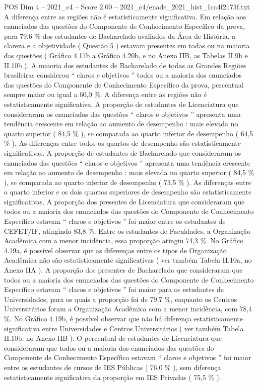 \begin{textsample}{POS Dim 4 – 2021\_c4 – Score 2.00 – 2021\_c4/enade\_2021\_hist\_1ca4f2173f.txt}
A diferença entre as regiões não é estatisticamente significativa.
Em relação aos enunciados das questões do Componente de Conhecimento Específico da prova, para 79,6 \% dos estudantes de Bacharelado avaliados da Área de História, a clareza e a objetividade ( Questão 5 ) estavam presentes em todas ou na maioria das questões ( Gráfico 4.17b a Gráfico 4.20b, e no Anexo IIB, as Tabelas II.9b e II.10b ).
A maioria dos estudantes de Bacharelado de todas as Grandes Regiões brasileiras considerou “ claros e objetivos ” todos ou a maioria dos enunciados das questões do Componente de Conhecimento Específico da prova, percentual sempre maior ou igual a 60,0 \%.
A diferença entre as regiões não é estatisticamente significativa.
A proporção de estudantes de Licenciatura que consideraram os enunciados das questões “ claros e objetivos ” apresenta uma tendência crescente em relação ao aumento de desempenho : mais elevada no quarto superior ( 84,5 \% ), se comparada ao quarto inferior de desempenho ( 64,5 \% ).
As diferenças entre todos os quartos de desempenho são estatisticamente significativas.
A proporção de estudantes de Bacharelado que consideraram os enunciados das questões “ claros e objetivos ” apresenta uma tendência crescente em relação ao aumento de desempenho : mais elevada no quarto superior ( 84,5 \% ), se comparada ao quarto inferior de desempenho ( 73,5 \% ).
As diferenças entre o quarto inferior e os dois quartos superiores de desempenho são estatisticamente significativas.
A proporção dos presentes de Licenciatura que consideraram que todos ou a maioria dos enunciados das questões do Componente de Conhecimento Específico estavam “ claros e objetivos ” foi maior entre os estudantes de CEFET/IF, atingindo 83,8 \%.
Entre os estudantes de Faculdades, a Organização Acadêmica com a menor incidência, essa proporção atingiu 74,3 \%.
No Gráfico 4.19a, é possível observar que as diferenças entre os tipos de Organização Acadêmica não são estatisticamente significativas ( ver também Tabela II.10a, no Anexo IIA ).
A proporção dos presentes de Bacharelado que consideraram que todos ou a maioria dos enunciados das questões do Componente de Conhecimento Específico estavam “ claros e objetivos ” foi maior para os estudantes de Universidades, para os quais a proporção foi de 79,7 \%, enquanto os Centros Universitários foram a Organização Acadêmica com a menor incidência, com 78,4 \%.
No Gráfico 4.19b, é possível observar que não há diferença estatisticamente significativa entre Universidades e Centros Universitários ( ver também Tabela II.10b, no Anexo IIB ).
O percentual de estudantes de Licenciatura que consideraram que todos ou a maioria dos enunciados das questões do Componente de Conhecimento Específico estavam “ claros e objetivos ” foi maior entre os estudantes de cursos de IES Públicas ( 76,0 \% ), sem diferença estatisticamente significativa da proporção em IES Privadas ( 75,5 \% ).

\end{textsample}

